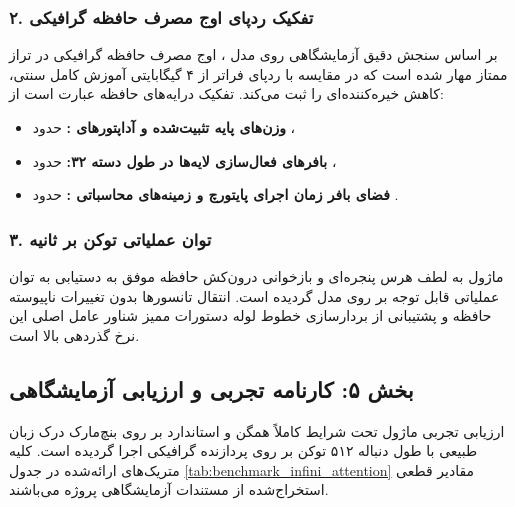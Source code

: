 \subsubsection*{۲. تفکیک ردپای اوج مصرف حافظه گرافیکی }
بر اساس سنجش دقیق آزمایشگاهی روی مدل ، اوج مصرف حافظه گرافیکی در تراز ممتاز  مهار شده است که در مقایسه با ردپای فراتر از ۴ گیگابایتی آموزش کامل سنتی، کاهش خیره‌کننده‌ای را ثبت می‌کند. تفکیک درایه‌های حافظه عبارت است از:
\begin{itemize}
    \item \textbf{وزن‌های پایه تثبیت‌شده و آداپتورهای :} حدود ،
    \item \textbf{بافرهای فعال‌سازی لایه‌ها  در طول دسته ۳۲:} حدود ،
    \item \textbf{فضای بافر زمان اجرای پایتورچ و زمینه‌های محاسباتی :} حدود .
\end{itemize}

\subsubsection*{۳. توان عملیاتی توکن بر ثانیه }
ماژول  به لطف هرس پنجره‌ای و بازخوانی درون‌کش حافظه موفق به دستیابی به توان عملیاتی قابل توجه  بر روی مدل  گردیده است. انتقال تانسورها بدون تغییرات ناپیوسته حافظه و پشتیبانی از بردارسازی خطوط لوله دستورات ممیز شناور  عامل اصلی این نرخ گذردهی بالا است.

\subsection*{بخش ۵: کارنامه تجربی و ارزیابی آزمایشگاهی }
ارزیابی تجربی ماژول  تحت شرایط کاملاً همگن و استاندارد بر روی بنچ‌مارک درک زبان طبیعی  با طول دنباله ۵۱۲ توکن بر روی پردازنده گرافیکی  اجرا گردیده است. کلیه متریک‌های ارائه‌شده در جدول \ref{tab:benchmark_infini_attention} مقادیر قطعی استخراج‌شده از مستندات آزمایشگاهی پروژه می‌باشند.


